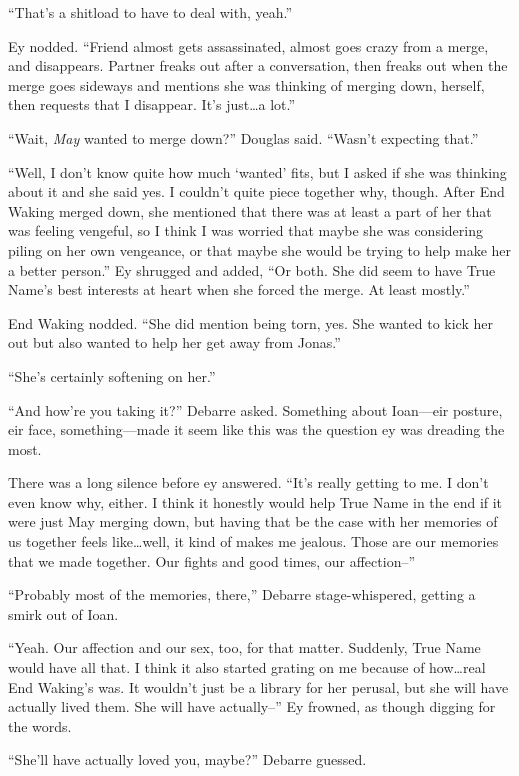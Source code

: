 ``That's a shitload to have to deal with, yeah.''

Ey nodded. ``Friend almost gets assassinated, almost goes crazy from a merge, and disappears. Partner freaks out after a conversation, then freaks out when the merge goes sideways and mentions she was thinking of merging down, herself, then requests that I disappear. It's just\ldots a lot.''

``Wait, \emph{May} wanted to merge down?'' Douglas said. ``Wasn't expecting that.''

``Well, I don't know quite how much `wanted' fits, but I asked if she was thinking about it and she said yes. I couldn't quite piece together why, though. After End Waking merged down, she mentioned that there was at least a part of her that was feeling vengeful, so I think I was worried that maybe she was considering piling on her own vengeance, or that maybe she would be trying to help make her a better person.'' Ey shrugged and added, ``Or both. She did seem to have True Name's best interests at heart when she forced the merge. At least mostly.''

End Waking nodded. ``She did mention being torn, yes. She wanted to kick her out but also wanted to help her get away from Jonas.''

``She's certainly softening on her.''

``And how're you taking it?'' Debarre asked. Something about Ioan—eir posture, eir face, something—made it seem like this was the question ey was dreading the most.

There was a long silence before ey answered. ``It's really getting to me. I don't even know why, either. I think it honestly would help True Name in the end if it were just May merging down, but having that be the case with her memories of us together feels like\ldots well, it kind of makes me jealous. Those are our memories that we made together. Our fights and good times, our affection--''

``Probably most of the memories, there,'' Debarre stage-whispered, getting a smirk out of Ioan.

``Yeah. Our affection and our sex, too, for that matter. Suddenly, True Name would have all that. I think it also started grating on me because of how\ldots real End Waking's was. It wouldn't just be a library for her perusal, but she will have actually lived them. She will have actually--'' Ey frowned, as though digging for the words.

``She'll have actually loved you, maybe?'' Debarre guessed.

